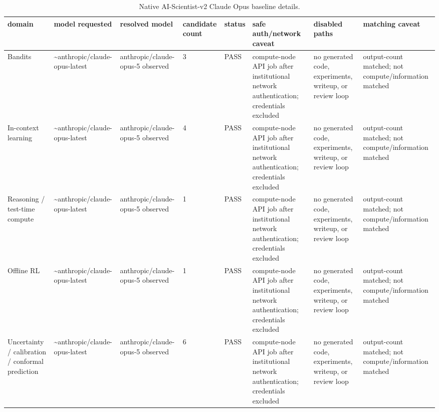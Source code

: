 \begin{table}[htbp]
\centering
\caption{Native AI-Scientist-v2 Claude Opus baseline details.}
\label{tab:claude\_opus\_details}
\begin{tabular}{llllllll}
\toprule
domain & model requested & resolved model & candidate count & status & safe auth/network caveat & disabled paths & matching caveat \\
\midrule
Bandits & \textasciitilde{}anthropic/claude-opus-latest & anthropic/claude-opus-5 observed & 3 & PASS & compute-node API job after institutional network authentication; credentials excluded & no generated code, experiments, writeup, or review loop & output-count matched; not compute/information matched \\
In-context learning & \textasciitilde{}anthropic/claude-opus-latest & anthropic/claude-opus-5 observed & 4 & PASS & compute-node API job after institutional network authentication; credentials excluded & no generated code, experiments, writeup, or review loop & output-count matched; not compute/information matched \\
Reasoning / test-time compute & \textasciitilde{}anthropic/claude-opus-latest & anthropic/claude-opus-5 observed & 1 & PASS & compute-node API job after institutional network authentication; credentials excluded & no generated code, experiments, writeup, or review loop & output-count matched; not compute/information matched \\
Offline RL & \textasciitilde{}anthropic/claude-opus-latest & anthropic/claude-opus-5 observed & 1 & PASS & compute-node API job after institutional network authentication; credentials excluded & no generated code, experiments, writeup, or review loop & output-count matched; not compute/information matched \\
Uncertainty / calibration / conformal prediction & \textasciitilde{}anthropic/claude-opus-latest & anthropic/claude-opus-5 observed & 6 & PASS & compute-node API job after institutional network authentication; credentials excluded & no generated code, experiments, writeup, or review loop & output-count matched; not compute/information matched \\
\bottomrule
\end{tabular}
\end{table}




